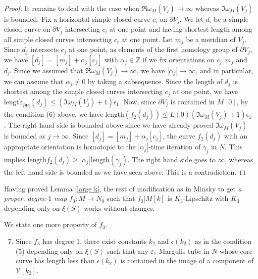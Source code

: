 \documentclass{amsart}
\theoremstyle{definition}
\numberwithin{figure}{section}
\numberwithin{equation}{section}
\newcommand{\blackboard}[1]{\ensuremath{\mathbb{#1}}}
\newcommand{\integers}{\blackboard{Z}} %
\newcommand{\length}{\mathrm{length}}
\def\cv{\mathcal{V}}
\def\length{\mathrm{length}}
\begin{document}
\begin{proof}
It remains to deal with the case when $\Re \omega_M(V_j) \rightarrow \infty$ whereas $\Im \omega_M(V_j)$ is bounded.
Fix a horizontal simple closed curve $c_i$ on $\partial V_j$.
We let $d_i$ be a simple closed curve on $\partial V_j$ intersecting $c_i$ at one point and having shortest length among all  simple closed curves intersecting $c_i$ at one point.
Let $m_j$ be a meridian of $V_j$.
Since $d_j$ intersects $c_j$ at one point, as elements of the first homology group of $\partial V_j$, we have $[d_j]=[m_j]+\alpha_j[c_j]$ with $\alpha_j \in \integers$ if we fix orientations on $c_j, m_j$ and $d_j$.
Since we assumed that $\Re \omega_M(V_j) \rightarrow \infty$, we have $|\alpha_j| \rightarrow \infty$, and in particular, we can assume that $\alpha_j \neq 0$ by taking a subsequence.
Since the length of $d_j$ is shortest among the simple closed curves intersecting $c_j$ at one point, we have $\length_{\partial V_j}(d_j) \leq (\Im\omega_M(V_j)+1)\epsilon_1$.
Now, since $\partial V_j$ is contained in $M[0]$, by the condition (6) above, we have $\length(f_2(d_j)) \leq L(0) (\Im\omega_M(V_j)+1)\epsilon_1$.
The right hand side is bounded above since we have already proved $\Im \omega_M(V_j)$ is bounded as $j \rightarrow \infty$.
Since $[d_j]=[m_j]+\alpha_j[c_j]$, the curve $f_2(d_j)$ with an appropriate orientation is homotopic to the $|\alpha_j|$-time iteration of $\gamma_j$ in $N$.
This implies $\length f_2(d_j) \geq |\alpha_j| \length(\gamma_j)$.
The right hand side goes to $\infty$, whereas  the left hand side is bounded as we have seen above.
This is a contradiction.
\end{proof}

Having proved Lemma \ref{large k}, the rest of modification as in Minsky \cite{mi2} to get {\em a proper, degree-$1$ map} $f_3: M \rightarrow N_0$ such that  $f_3|M[k]$ is $K_3$-Lipschitz with $K_3$ depending only on $\xi(S)$ works without changes.

We state one more property of $f_3$. 
\begin{enumerate}
\setcounter{enumi}{6}
\item
Since $f_3$ has degree $1$,  there exist constants  $k_2$ and $\epsilon(k_2)$ as in the condition (5) depending only on $\xi(S)$ such that any $\varepsilon_1$-Margulis tube in $N$ whose core curve has length less than $\epsilon(k_2)$ is contained in the image of a component of $\cv[k_2]$.
\end{enumerate}
\end{document}
